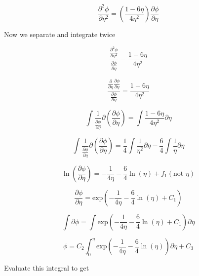 \begin{equation*}
  \frac{\partial^{2}\phi}{\partial\eta^{2}}=\left(\frac{1-6\eta}{4\eta^{2}}\right)\frac{\partial\phi}{\partial\eta}
\end{equation*}

Now we separate and integrate twice

\begin{equation*}
  \frac{\frac{\partial^{2}\phi}{\partial\eta^{2}}}{\frac{\partial\phi}{\partial\eta}}=\frac{1-6\eta}{4\eta^{2}}
\end{equation*}

\begin{equation*}
  \frac{\frac{\partial}{\partial\eta}\frac{\partial\phi}{\partial\eta}}{\frac{\partial\phi}{\partial\eta}}=\frac{1-6\eta}{4\eta^{2}}
\end{equation*}

\begin{equation*}
  \int\frac{1}{\frac{\partial\phi}{\partial\eta}}\partial\left(\frac{\partial\phi}{\partial\eta}\right)=\int\frac{1-6\eta}{4\eta^{2}}\partial\eta
\end{equation*}

\begin{equation*}
  \int\frac{1}{\frac{\partial\phi}{\partial\eta}}\partial\left(\frac{\partial\phi}{\partial\eta}\right)=\frac{1}{4}\int\frac{1}{\eta^{2}}\partial\eta-\frac{6}{4}\int\frac{1}{\eta}\partial\eta
\end{equation*}

\begin{equation*}
  \ln\left(\frac{\partial\phi}{\partial\eta}\right)=-\frac{1}{4\eta}-\frac{6}{4}\ln(\eta)+f_{1}(\text{not }\eta)
\end{equation*}

\begin{equation*}
  \frac{\partial\phi}{\partial\eta}=\text{exp}\left(-\frac{1}{4\eta}-\frac{6}{4}\ln(\eta)+C_{1}\right)
\end{equation*}

\begin{equation*}
  \int\partial\phi=\int\text{exp}\left(-\frac{1}{4\eta}-\frac{6}{4}\ln(\eta)+C_{1}\right)\partial\eta
\end{equation*}

\begin{equation*}
  \phi=C_{2}\int_{0}^{\eta}\text{exp}\left(-\frac{1}{4\eta}-\frac{6}{4}\ln(\eta)\right)\partial\eta+C_{3}
\end{equation*}

Evaluate this integral to get

